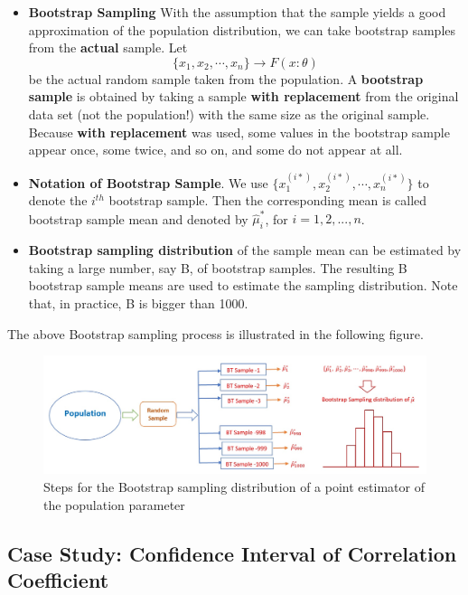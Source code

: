 \documentclass[
]{book}
\begin{document}
\begin{itemize}
\item
  \textbf{Bootstrap Sampling} With the assumption that the sample yields a good approximation of the population distribution, we can take bootstrap samples from the \textbf{actual} sample. Let
  \[\{x_1, x_2, \cdots, x_n\} \to F(x:\theta)\] be the actual random sample taken from the population. A \textbf{bootstrap sample} is obtained by taking a sample \textbf{with replacement} from the original data set (not the population!) with the same size as the original sample. Because \textbf{with replacement} was used, some values in the bootstrap sample appear once, some twice, and so on, and some do not appear at all.
\item
  \textbf{Notation of Bootstrap Sample}. We use \(\{x_1^{(i*)}, x_2^{(i*)}, \cdots, x_n^{(i*)}\}\) to denote the \(i^{th}\) bootstrap sample. Then the corresponding mean is called bootstrap sample mean and denoted by \(\hat{\mu}_i^*\), for \(i = 1, 2, ..., n\).
\item
  \textbf{Bootstrap sampling distribution} of the sample mean can be estimated by taking a large number, say B, of bootstrap samples. The resulting B bootstrap sample means are used to estimate the sampling distribution. Note that, in practice, B is bigger than 1000.
\end{itemize}

The above Bootstrap sampling process is illustrated in the following figure.

\begin{figure}

{\centering \includegraphics[width=0.8\linewidth]{img09/w09-BootSamplingDist} 

}

\caption{Steps for the Bootstrap sampling distribution of a point estimator of the population parameter}\label{fig:unnamed-chunk-222}
\end{figure}

\hfill\break

\hypertarget{case-study-confidence-interval-of-correlation-coefficient}{%
\subsection{Case Study: Confidence Interval of Correlation Coefficient}\label{case-study-confidence-interval-of-correlation-coefficient}}
\end{document}
